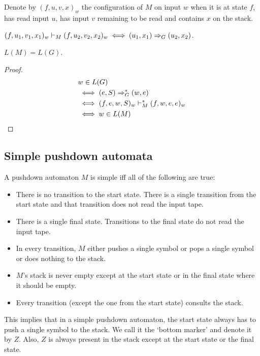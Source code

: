 Denote by $(f, u, v, x)_w$ the configuration of $M$ on input $w$ when it is at state $f$,
has read input $u$, has input $v$ remaining to be read and contains $x$ on the stack.

\begin{theorem}
$(f, u_1, v_1, x_1)_w \vdash_M (f, u_2, v_2, x_2)_w \iff (u_1, x_1) \Rightarrow_{G} (u_2, x_2)$.
\end{theorem}
\begin{theorem}$L(M) = L(G)$.\end{theorem}
\begin{proof}
\begin{align*}
& w \in L(G)
\\ &\iff (e, S) \Rightarrow_{G}^* (w, e)
\\ &\iff (f, e, w, S)_w \vdash_M^* (f, w, e, e)_w
\\ &\iff w \in L(M)
\end{align*}
\end{proof}

\subsection{Simple pushdown automata}

A pushdown automaton $M$ is simple iff all of the following are true:
\begin{itemize}
\item There is no transition to the start state.
    There is a single transition from the start state
    and that transition does not read the input tape.
\item There is a single final state.
    Transitions to the final state do not read the input tape.
\item In every transition, $M$ either pushes a single symbol or pops a single symbol or does nothing to the stack.
\item $M$'s stack is never empty except at the start state or in the final state where it should be empty.
\item Every transition (except the one from the start state) consults the stack.
\end{itemize}

This implies that in a simple pushdown automaton,
the start state always has to push a single symbol to the stack.
We call it the `bottom marker' and denote it by $Z$.
Also, $Z$ is always present in the stack except at the start state or the final state.

